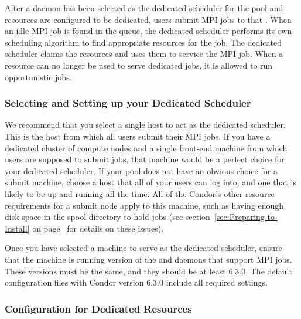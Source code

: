 After a  daemon has been selected as the dedicated scheduler
for the pool and resources are configured to be
dedicated, users submit MPI jobs to that .
When an idle MPI job is found in the queue, the dedicated scheduler
performs its own scheduling algorithm to find appropriate
resources for the job.
The dedicated scheduler claims the resources and uses them to
service the MPI job.
When a resource can no longer be used to serve dedicated jobs, it is
allowed to run opportunistic jobs.


\subsubsection{\label{sec:Setup-Dedicated-Scheduler}
Selecting and Setting up your Dedicated Scheduler}

We recommend that you select a single host to act as the
dedicated scheduler.
This is the host from which all users submit their MPI jobs.
If you have a dedicated cluster of compute nodes and a single
front-end machine from which users are supposed to submit jobs, that
machine would be a perfect choice for your dedicated
scheduler.
If your pool does not have an obvious choice for a submit machine,
choose a host that all of your users can log into, and one
that is likely to be up and running all the time.
All of the Condor's other resource requirements for a submit node apply to
this machine, such as having enough disk space in the spool
directory to hold jobs (see section~\ref{sec:Preparing-to-Install} on
page~\pageref{sec:Preparing-to-Install} for details on these issues). 

Once you have selected a machine to serve as the dedicated scheduler,
ensure that the machine is running version of the 
and  daemons that support MPI jobs.
These versions must be the same,
and they should be at least 6.3.0.
The default configuration files with Condor version 6.3.0 include all
required settings.

\subsubsection{\label{sec:Configure-Dedicated-Resource}
Configuration for Dedicated Resources} 

